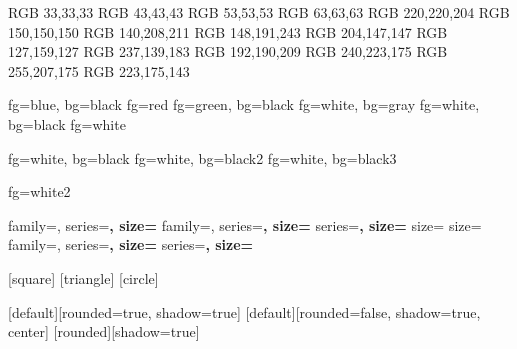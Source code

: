
\definecolor{black}   {RGB} {33,33,33}
\definecolor{black2}  {RGB} {43,43,43}
\definecolor{black3}  {RGB} {53,53,53}
\definecolor{gray}    {RGB} {63,63,63}
\definecolor{white}   {RGB} {220,220,204}
\definecolor{white2}  {RGB} {150,150,150}
\definecolor{cyan}    {RGB} {140,208,211}
\definecolor{blue}    {RGB} {148,191,243}
\definecolor{red}     {RGB} {204,147,147} 
\definecolor{green}   {RGB} {127,159,127}
\definecolor{magenta} {RGB} {237,139,183}
\definecolor{purple}  {RGB} {192,190,209}
\definecolor{yellow}  {RGB} {240,223,175}
\definecolor{brown}   {RGB} {255,207,175}
\definecolor{orange}  {RGB} {223,175,143}


          {fg=blue, bg=black}
         {fg=red}
     {fg=green, bg=black}
    {fg=white, bg=gray} 
           {fg=white, bg=black} 
 {fg=white}

   {fg=white, bg=black}
 {fg=white, bg=black2}
      {fg=white, bg=black3}

           {fg=white2}

          {family=\sffamily, series=\bfseries, size=\Large}
       {family=\sffamily, series=\bfseries, size=\large}
         {series=\bfseries, size=\normalsize}
      {size=\small}
           {size=\scriptsize} 
     {family=\sffamily, series=\bfseries, size=\Large}
 {series=\bfseries, size=\large}

[square]
[triangle]
[circle]

\setlength{\leftmargini}{0pt}

[default][rounded=true, shadow=true]
[default][rounded=false, shadow=true, center]
[rounded][shadow=true] 

